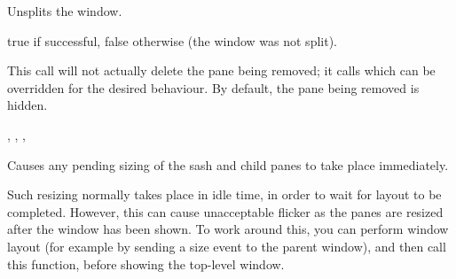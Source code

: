 
Unsplits the window.




true if successful, false otherwise (the window was not split).


This call will not actually delete the pane being removed; it calls \rtfsp
which can be overridden for the desired behaviour. By default, the pane being removed is hidden.


, ,\rtfsp
{}, 

\label{wxsplitterwindowupdatesize}


Causes any pending sizing of the sash and child panes to take place
immediately.

Such resizing normally takes place in idle time, in order
to wait for layout to be completed. However, this can cause
unacceptable flicker as the panes are resized after the window has been
shown. To work around this, you can perform window layout (for
example by sending a size event to the parent window), and then
call this function, before showing the top-level window.

